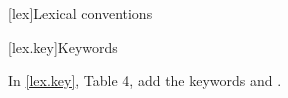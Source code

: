 
[lex]{Lexical conventions}

[lex.key]{Keywords}

In \ref{lex.key}, Table 4, add the keywords  and .
